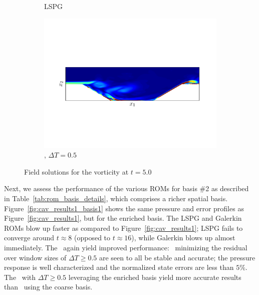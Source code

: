\begin{figure}
\begin{center}
\begin{subfigure}[t]{0.95\textwidth}
\caption{LSPG} 
\end{subfigure}
\begin{subfigure}[t]{0.95\textwidth}
\includegraphics[trim={0cm 3.9cm 0cm 3.9cm},clip,width=1.\linewidth]{figs/cavity/u_c5_t5_basis2.pdf}
\caption{\methodAcronym, $\Delta T = 0.5$} 
\end{subfigure}
\caption{Field solutions for the vorticity at $t = 5.0$}
\label{fig:cav_snapshots}
\end{center}
\end{figure}


Next, we assess the performance of the various ROMs for basis \#2 as described in Table~\ref{tab:rom_basis_details}, which comprises a richer spatial basis.
 Figure~\ref{fig:cav_results1_basis1} shows the same pressure and error profiles as Figure~\ref{fig:cav_results1}, but for the enriched basis. The LSPG and Galerkin ROMs blow up faster as compared to Figure~\ref{fig:cav_results1}; LSPG fails to converge around $t \approx 8$ (opposed to $t \approx 16$), while Galerkin blows up almost immediately. The 
\methodAcronymROMs\ again yield improved performance: \methodAcronymROMs\ minimizing the residual over window sizes of $\Delta T \ge 0.5$ are seen to all be stable and accurate; the pressure response is well characterized and the normalized state errors are less than $5\%$. The \methodAcronymROMs\ with $\Delta T \ge 0.5$ leveraging the enriched basis yield more accurate results than \methodAcronymROMs\ using the coarse basis.
 

